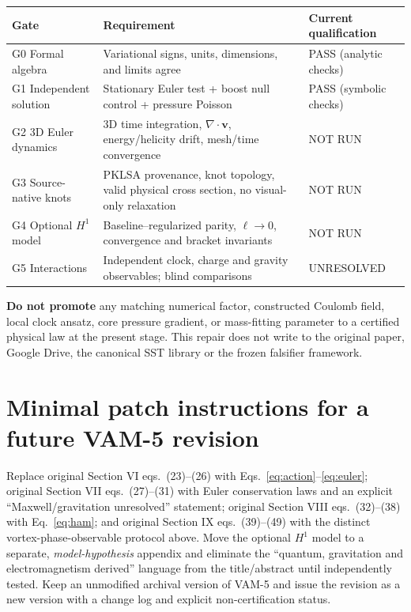 \documentclass[11pt,a4paper]{article}
\newcommand{\vv}{\mathbf v}
\begin{document}
\begin{center}\small
\begin{tabular}{p{25mm}p{78mm}p{38mm}}\toprule
Gate & Requirement & Current qualification \\ \midrule
G0 Formal algebra & Variational signs, units, dimensions, and limits agree & PASS (analytic checks)\\
G1 Independent solution & Stationary Euler test + boost null control + pressure Poisson & PASS (symbolic checks)\\
G2 3D Euler dynamics & 3D time integration, $\nabla\cdot\vv$, energy/helicity drift, mesh/time convergence & NOT RUN\\
G3 Source-native knots & PKLSA provenance, knot topology, valid physical cross section, no visual-only relaxation & NOT RUN\\
G4 Optional $H^1$ model & Baseline--regularized parity, $\ell\to0$, convergence and bracket invariants & NOT RUN\\
G5 Interactions & Independent clock, charge and gravity observables; blind comparisons & UNRESOLVED\\ \bottomrule
\end{tabular}
\end{center}
\textbf{Do not promote} any matching numerical factor, constructed Coulomb field, local clock ansatz, core pressure gradient, or mass-fitting parameter to a certified physical law at the present stage. This repair does not write to the original paper, Google Drive, the canonical SST library or the frozen falsifier framework.

\section{Minimal patch instructions for a future VAM-5 revision}
Replace original Section VI eqs.~(23)--(26) with Eqs.~\eqref{eq:action}--\eqref{eq:euler}; original Section VII eqs.~(27)--(31) with Euler conservation laws and an explicit ``Maxwell/gravitation unresolved'' statement; original Section VIII eqs.~(32)--(38) with Eq.~\eqref{eq:ham}; and original Section IX eqs.~(39)--(49) with the distinct vortex-phase-observable protocol above. Move the optional $H^1$ model to a separate, \emph{model-hypothesis} appendix and eliminate the ``quantum, gravitation and electromagnetism derived'' language from the title/abstract until independently tested. Keep an unmodified archival version of VAM-5 and issue the revision as a new version with a change log and explicit non-certification status.
\end{document}
